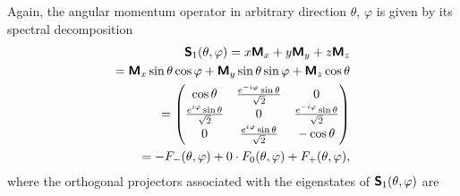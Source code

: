 Again, the angular momentum operator in arbitrary direction $\theta$, $\varphi$ is given by its spectral decomposition
\begin{equation}
\begin{split}
\textsf{\textbf{S}}_1 (\theta ,\varphi) =
x\textsf{\textbf{M}}_x
+
y\textsf{\textbf{M}}_y
+
z\textsf{\textbf{M}}_z  \\
=
 \textsf{\textbf{M}}_x  \sin \theta \cos \varphi
+
\textsf{\textbf{M}}_y   \sin \theta \sin \varphi
+
\textsf{\textbf{M}}_z   \cos \theta
\\
=   \begin{pmatrix}
\cos \theta & {e^{-i\varphi}\sin \theta \over \sqrt{2}}& 0      \\
{e^{i\varphi}\sin \theta \over \sqrt{2}}& 0
& {e^{-i\varphi}\sin \theta \over \sqrt{2}}      \\
0& {e^{i\varphi}\sin \theta \over \sqrt{2}}& -\cos \theta
\end{pmatrix}     \\
= -F_{-}(\theta ,\varphi)+0\cdot F_0(\theta ,\varphi) +F_{+}(\theta ,\varphi),
\end{split}
\label{e-2009-gtq-s3}
\end{equation}
where the orthogonal projectors associated with the eigenstates of $\textsf{\textbf{S}}_1 (\theta ,\varphi)$ are

